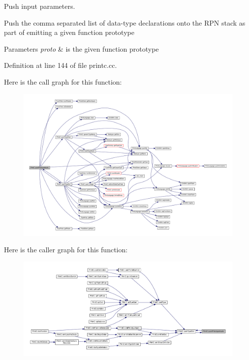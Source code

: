 Push input parameters. 

Push the comma separated list of data-\/type declarations onto the R\+PN stack as part of emitting a given function prototype 
\begin{DoxyParams}{Parameters}
{\em proto} & is the given function prototype \\
\hline
\end{DoxyParams}


Definition at line 144 of file printc.\+cc.

Here is the call graph for this function\+:
\nopagebreak
\begin{figure}[H]
\begin{center}
\leavevmode
\includegraphics[width=350pt]{class_print_c_aae46702bfe38061e0c0563f7a8a20d82_cgraph}
\end{center}
\end{figure}
Here is the caller graph for this function\+:
\nopagebreak
\begin{figure}[H]
\begin{center}
\leavevmode
\includegraphics[width=350pt]{class_print_c_aae46702bfe38061e0c0563f7a8a20d82_icgraph}
\end{center}
\end{figure}
\mbox{\label{class_print_c_ac3096b61ae4a7d0e78200fa946c54a95}} 

